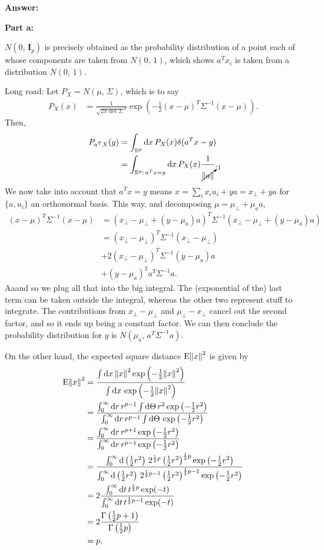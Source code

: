 \documentclass{article}
\begin{document}
\textbf{Answer:}

\textbf{Part a:}

$N(0,\,\mathbf I_p)$ is precisely obtained as the probability distribution of a point each of whose components are taken from $N(0,\,1)$, which shows $a^Tx_i$ is taken from a distribution $N(0,\,1)$.

Long road: Let $P_X=N(\mu,\,\Sigma)$, which is to say
\begin{align}
	P_X(x)&=\frac{1}{\sqrt{2\pi\det\Sigma}^p}\exp\left(-\frac12\left(x-\mu\right)^T\Sigma^{-1}\left(x-\mu\right)\right).
\end{align}
Then,
\begin{align}
	P_{a^TX}(y)&=\int_{\mathbb R^p}\mathrm dx\,P_X(x)\delta(a^Tx-y)\\
	&=\int_{\mathbb R^p:\,a^Tx=y}\mathrm dx\,P_X(x)\frac{1}{\cancelto{1}{\norm{a}}}.
\end{align}
We now take into account that $a^Tx=y$ means $x=\sum_ix_iu_i+ya=x_\perp+ya$ for $\{a, u_i\}$ an orthonormal basis. This way, and decomposing $\mu=\mu_\perp+\mu_aa$,
\begin{align}
	(x-\mu)^T\Sigma^{-1}(x-\mu)&=(x_\perp-\mu_\perp+(y-\mu_a)a)^T\Sigma^{-1}(x_\perp-\mu_\perp+(y-\mu_a)a)\\
	&=(x_\perp-\mu_\perp)^T\Sigma^{-1}(x_\perp-\mu_\perp)\\
	&+2(x_\perp-\mu_\perp)^T\Sigma^{-1}(y-\mu_a)a\\
	&+(y-\mu_a)^2a^T\Sigma^{-1}a.
\end{align}
Aaand so we plug all that into the big integral. The (exponential of the) last term can be taken outside the integral, whereas the other two represent stuff to integrate. The contributions from $x_\perp-\mu_\perp$ and $\mu_\perp-x_\perp$ cancel out the second factor, and so it ends up being a constant factor. We can then conclude the probability distribution for $y$ is $N(\mu_a,\,a^T\Sigma^{-1}a)$.

On the other hand, the expected square distance $\mathrm E\norm{x}^2$ is given by
\begin{align}
	\mathrm E\norm{x}^2&=\frac{\int\mathrm dx\,\norm{x}^2\exp\left(-\frac12\norm{x}^2\right)}{\int\mathrm dx\,\exp\left(-\frac12\norm{x}^2\right)}\\
	&=\frac{\int_0^\infty\mathrm dr\,r^{p-1}\int\mathrm d\Theta\,r^2\exp\left(-\frac12r^2\right)}{\int_0^\infty\mathrm dr\,r^{p-1}\int\mathrm d\Theta\,\exp\left(-\frac12r^2\right)}\\
	&=\frac{\int_0^\infty\mathrm dr\,r^{p+1}\exp\left(-\frac12r^2\right)}{\int_0^\infty\mathrm dr\,r^{p-1}\exp\left(-\frac12r^2\right)}\\
	&=\frac{\int_0^\infty\mathrm d\left(\frac12r^2\right)\,2^{\frac12p}\left(\frac12r^2\right)^{\frac12p}\exp\left(-\frac12r^2\right)}{\int_0^\infty\mathrm d\left(\frac12r^2\right)\,2^{\frac12p-1}\left(\frac12r^2\right)^{\frac12p-1}\exp\left(-\frac12r^2\right)}\\
	&=2\frac{\int_0^\infty\mathrm dt\,t^{\frac12p}\exp(-t)}{\int_0^\infty\mathrm dt\,t^{\frac12p-1}\exp(-t)}\\
	&=2\frac{\Gamma\left(\frac12p+1\right)}{\Gamma\left(\frac12p\right)}\\
	&=p.
\end{align}
\end{document}
